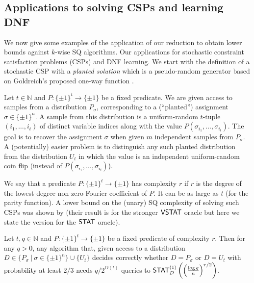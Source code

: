 \subsection{Applications to solving CSPs and learning DNF}
\label{sec:lower-bounds}
We now give some examples of the application of our reduction to obtain lower bounds against $k$-wise SQ algorithms. Our applications for stochastic constraint satisfaction problems (CSPs) and DNF learning. We start with the definition of a stochastic CSP with a {\em planted solution} which is a pseudo-random generator based on Goldreich's proposed one-way function \cite{goldreich2000candidate}.
\begin{definition}
Let $t \in \mathbb{N}$ and $P: \{\pm 1\}^t \to \{\pm 1\}$ be a fixed predicate. We are given access to samples from a distribution $P_{\sigma}$, corresponding to a (``planted'') assignment $\sigma \in \{\pm 1 \}^n$. A sample from this distribution is a uniform-random  $t$-tuple $(i_1, \dots, i_t)$ of distinct variable indices along with the value $P(\sigma_{i_1}, \dots, \sigma_{i_t})$. The goal is to recover the assignment $\sigma$ when given $m$ independent samples from $P_{\sigma}$. A (potentially) easier problem is to distinguish any such planted distribution from the distribution $U_t$ in which the value is an independent uniform-random coin flip (instead of $P(\sigma_{i_1}, \dots, \sigma_{i_t})$).
\end{definition}
We say that a predicate $P: \{\pm 1\}^t \to \{\pm 1\}$ has complexity $r$ if $r$ is the degree of the lowest-degree non-zero Fourier coefficient of $P$. It can be as large as $t$ (for the parity function).
A lower bound on the (unary) SQ complexity of solving such CSPs was shown by \cite{FeldmanPV:13} (their result is for the stronger $\mathsf{VSTAT}$ oracle but here we state the version for the $\mathsf{STAT}$ oracle).
\begin{theorem}\label{thm:FPV_csp}
Let $t, q \in \mathbb{N}$ and $P: \{\pm 1\}^t \to \{\pm 1\}$ be a fixed predicate of complexity $r$. Then for any $q >0$, any  algorithm that, given access to a distribution $D \in \{P_\sigma\ |\  \sigma  \in \{\pm 1 \}^n\} \cup \{U_t\}$  decides correctly whether $D = P_\sigma$ or $D=U_t$ with probability at least $2/3$ needs $q/2^{O(t)}$ queries to $\mathsf{STAT}^{(1)}_D\left(\left(\frac{\log q}{n}\right)^{r/2}\right)$.
\end{theorem}

